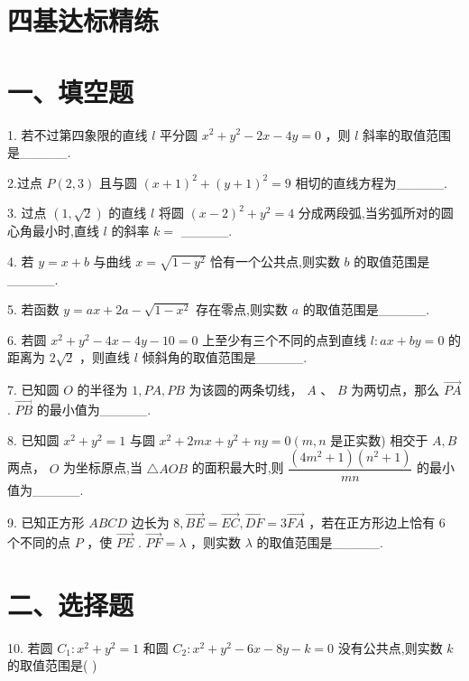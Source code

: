 \section*{四基达标精练}

\section*{一、填空题}

1. 若不过第四象限的直线 $l$ 平分圆 ${x}^{2} + {y}^{2} - {2x} - {4y} = 0$ ，则 $l$ 斜率的取值范围是\_\_\_\_\_.

2.过点 $P\left( {2,3}\right)$ 且与圆 ${\left( x + 1\right) }^{2} + {\left( y + 1\right) }^{2} = 9$ 相切的直线方程为\_\_\_\_\_.

3. 过点 $\left( {1,\sqrt{2}}\right)$ 的直线 $l$ 将圆 ${\left( x - 2\right) }^{2} + {y}^{2} = 4$ 分成两段弧,当劣弧所对的圆心角最小时,直线 $l$ 的斜率 $k =$ \_\_\_\_\_.

4. 若 $y = x + b$ 与曲线 $x = \sqrt{1 - {y}^{2}}$ 恰有一个公共点,则实数 $b$ 的取值范围是\_\_\_\_\_.

5. 若函数 $y = {ax} + {2a} - \sqrt{1 - {x}^{2}}$ 存在零点,则实数 $a$ 的取值范围是\_\_\_\_\_.

6. 若圆 ${x}^{2} + {y}^{2} - {4x} - {4y} - {10} = 0$ 上至少有三个不同的点到直线 $l : {ax} + {by} = 0$ 的距离为 $2\sqrt{2}$ ，则直线 $l$ 倾斜角的取值范围是\_\_\_\_\_.

7. 已知圆 $O$ 的半径为 $1,{PA},{PB}$ 为该圆的两条切线， $A$ 、 $B$ 为两切点，那么 $\overrightarrow{PA}$ . $\overrightarrow{PB}$ 的最小值为\_\_\_\_\_.

8. 已知圆 ${x}^{2} + {y}^{2} = 1$ 与圆 ${x}^{2} + {2mx} + {y}^{2} + {ny} = 0\left( {m,n}\right.$ 是正实数) 相交于 $A,B$ 两点， $O$ 为坐标原点,当 $\bigtriangleup {AOB}$ 的面积最大时,则 $\dfrac{\left( {4{m}^{2} + 1}\right) \left( {{n}^{2} + 1}\right) }{mn}$ 的最小值为\_\_\_\_\_.

9. 已知正方形 ${ABCD}$ 边长为 $8,\overrightarrow{BE} = \overrightarrow{EC},\overrightarrow{DF} = 3\overrightarrow{FA}$ ，若在正方形边上恰有 6 个不同的点 $P$ ，使 $\overrightarrow{PE}$ . $\overrightarrow{PF} = \lambda$ ，则实数 $\lambda$ 的取值范围是\_\_\_\_\_.

\section*{二、选择题}

10. 若圆 ${C}_{1} : {x}^{2} + {y}^{2} = 1$ 和圆 ${C}_{2} : {x}^{2} + {y}^{2} - {6x} - {8y} - k = 0$ 没有公共点,则实数 $k$ 的取值范围是( )

